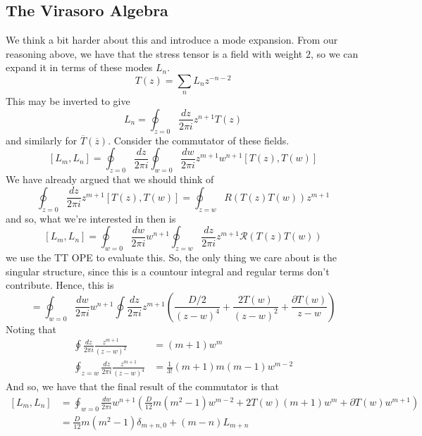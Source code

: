 \documentclass[11pt, oneside]{article}   	%
\theoremstyle{slanted}
\begin{document}
\subsection{The Virasoro Algebra}
We think a bit harder about this and introduce 
a mode expansion. 
From our reasoning above, 
we have that the stress tensor is a field with weight $ 2 $, 
so we can expand it in terms of these modes $ L _ n $. 
\[
 T \left(  z \right)   = \sum_ n L _ n z ^{ - n - 2 } 
\] This may be 
 inverted to give 
 \[
	 L _ n  = \oint_{ z  =0 } \frac{dz }{ 2 \pi i } z ^{ n + 1  } T \left(  z \right) 
 \] and similarly for $ \overline{ T } \left( \overline{ z  }  \right)  $. 
Consider the commutator 
of these fields. 
\[
 \left[  L _ m , L _ n  \right]   = \oint_{ z = 0 } 
 \frac{dz }{ 2 \pi i } \oint_{ w = 0 } \frac{dw }{ 2 \pi i } z ^{ m + 1 } w ^{ n + 1 } \left[ 
 T \left( z  \right)  , T \left(  w  \right)  \right]  
\] We have already argued 
that we should think of 
\[
	\oint_{ z = 0 } \frac{dz }{ 2 \pi i } z ^{ m + 1 } \left[  T \left(  z  \right)  , T \left( w  \right)   \right]  
	= \oint _{  z = w }  R\left( T \left( z  \right)  T \left( w  \right)   \right)  z ^{ m + 1 } 
\] and so, what we're interested in then 
is 
\[
 \left[  L _ m , L _ n  \right]   = \oint _{ w = 0 } 
 \frac{dw }{ 2 \pi i } w ^{ n + 1 } \oint _{ z = w  } \frac{dz }{ 2 \pi i } z ^{ m + 1 } \mathcal{ R } 
 \left( T \left(  z   \right)  T \left(   w  \right)  \right) 
\] we use the TT OPE to evaluate this. 
So, the only thing we care about is the 
singular structure, since this is a 
countour integral and regular terms 
don't contribute. 
Hence, this is 
\[
  = \oint_{ w = 0 } \frac{dw  }{ 2 \pi i } w ^{ n + 1 } 
  \oint \frac{dz }{ 2 \pi i } z ^{ m + 1 } \left( 
  \frac{D  /  2 }{ \left( z - w  \right)  ^{ 4 } } + \frac{ 2 T \left(  w  \right)  }{\left( 
  z -  w \right)  ^{  2}   } + \frac{\partial  T \left(  w  \right)  }{z - w   }\right) 
\] 
Noting that 
\begin{align*}
	\oint \frac{dz  }{ 2 \pi i } \frac{z ^{ m + 1 } }{ \left( z - w  \right)  ^ 2 }  & = \left( m + 1  \right)  w ^{ m } \\
	\oint_{ z = w } \frac{d z }{ 2 \pi i } \frac{z ^{ m + 1 } }{ \left( z - w  \right)  ^ 4 }
											 & = \frac{1}{3 ! } \left( m + 1  \right)  m \left( m - 1  \right)  w ^{ m - 2 } 
\end{align*}
And so, we have that 
the final result of the 
commutator is that 
\begin{align*}
	\left[  L _ m ,  L _ n  \right]  &=  \oint_{ w = 0 } 
	\frac{dw }{ 2 \pi i } w ^{ n + 1 } \left( \frac{D}{12 } m \left( m ^ 2 - 1  \right)  w ^{ m - 2 } 
	+ 2 T \left(  w  \right)  \left( m + 1  \right)  w ^{ m } + \partial  T \left(  w  \right) w ^{ m + 1 } \right) \\
					 &=  \frac{D }{ 12 } m \left(  m^ 2 - 1  \right)  \delta _{ m + n , 0} 
					 + \left( m - n  \right)  L _{ m + n } \\
\end{align*}
\end{document}
